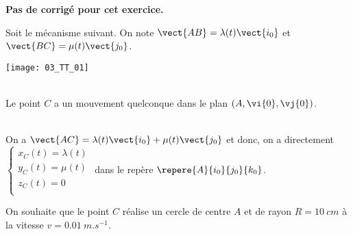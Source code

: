 \normaltrue
\correctiontrue



\setcounter{numques}{0}
\ifcorrection
\else
\textbf{Pas de corrigé pour cet exercice.}
\fi

\ifprof
\else
Soit le mécanisme suivant. On note $\vect{AB}=\lambda(t)\vect{i_0}$ et $\vect{BC}=\mu(t)\vect{j_0}$.
\begin{center}
\texttt{[image: 03\_TT\_01]}
\end{center}
\fi


\ifprof
\else
{}
\fi

\ifprof ~\\
Le point $C$ a un mouvement quelconque dans le plan $\left(A,\vi{0},\vj{0}\right)$.
\else
\fi

\ifprof ~\\
On  a $\vect{AC}=\lambda(t)\vect{i_0}+\mu(t)\vect{j_0}$ et donc, on a directement 
$\left\{
\begin{array}{l}
x_C(t)= \lambda(t) \\
y_C(t)= \mu(t)\\
z_C(t)= 0\\
\end{array}
\right.
$ dans le repère $\repere{A}{i_0}{j_0}{k_0}$.

\else
\fi

On souhaite que le point $C$ réalise un cercle de centre $A$ et de rayon $R=\SI{10}{cm}$ à la vitesse $v=\SI{0,01}{m.s^{-1}}$. 


